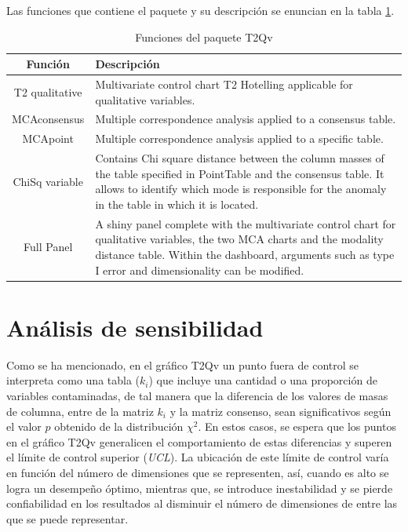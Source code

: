 \documentclass[water,article,submit,moreauthors,pdftex]{mdpi}
\begin{document}
Las funciones que contiene el paquete y su descripción se enuncian en la
tabla \ref{tab:functions}.

\begin{table}[!ht]
\begin{center}
 \begin{tabular}{||c  m{35em}||} 
 \hline
  Función & Descripción \\ [0.5ex] 
 \hline\hline
 T2 qualitative & Multivariate control chart T2 Hotelling applicable for qualitative variables.\\
 \hline
  MCAconsensus & Multiple correspondence analysis applied to a consensus table.\\
\hline
  MCApoint & Multiple correspondence analysis applied to a specific table.\\
\hline
  ChiSq variable & Contains Chi square distance between the column masses of the table specified in PointTable and the consensus table. It allows to identify which mode is responsible for the anomaly in the table in which it is located. \\ [1ex] 
  \hline
  Full Panel & A shiny panel complete with the 
  multivariate control chart for 
  qualitative variables, the two MCA 
  charts and the modality distance table. 
  Within the dashboard, arguments such as 
  type I error and dimensionality can be 
  modified. \\ [1ex] 
 \hline
\end{tabular}\caption{Funciones del paquete T2Qv}
\label{tab:functions}
\end{center}
\end{table}

\hypertarget{anuxe1lisis-de-sensibilidad}{%
\section{Análisis de sensibilidad}\label{anuxe1lisis-de-sensibilidad}}

Como se ha mencionado, en el gráfico T2Qv un punto fuera de control se
interpreta como una tabla (\(k_i\)) que incluye una cantidad o una
proporción de variables contaminadas, de tal manera que la diferencia de
los valores de masas de columna, entre de la matriz \(k_i\) y la matriz
consenso, sean significativos según el valor \(p\) obtenido de la
distribución \(\chi^2\). En estos casos, se espera que los puntos en el
gráfico T2Qv generalicen el comportamiento de estas diferencias y
superen el límite de control superior (\emph{UCL}). La ubicación de este
límite de control varía en función del número de dimensiones que se
representen, así, cuando es alto se logra un desempeño óptimo, mientras
que, se introduce inestabilidad y se pierde confiabilidad en los
resultados al disminuir el número de dimensiones de entre las que se
puede representar.
\end{document}
